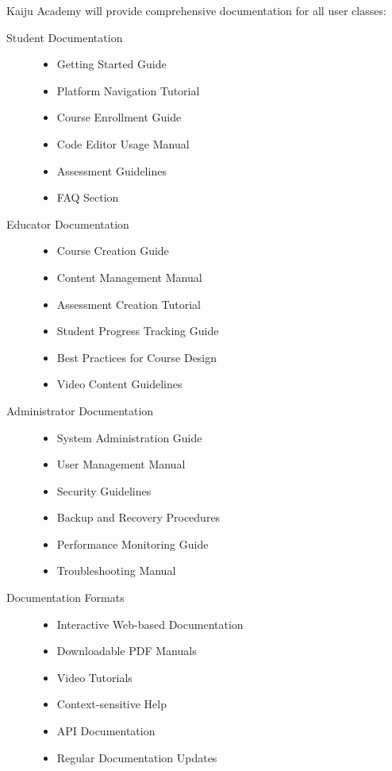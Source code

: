 \documentclass[a4paper, 11pt]{scrreprt}
\begin{document}
Kaiju Academy will provide comprehensive documentation for all user classes:

\begin{description}
    \item[Student Documentation]
        \begin{itemize}
            \item Getting Started Guide
            \item Platform Navigation Tutorial
            \item Course Enrollment Guide
            \item Code Editor Usage Manual
            \item Assessment Guidelines
            \item FAQ Section
        \end{itemize}
    
    \item[Educator Documentation]
        \begin{itemize}
            \item Course Creation Guide
            \item Content Management Manual
            \item Assessment Creation Tutorial
            \item Student Progress Tracking Guide
            \item Best Practices for Course Design
            \item Video Content Guidelines
        \end{itemize}
    
    \item[Administrator Documentation]
        \begin{itemize}
            \item System Administration Guide
            \item User Management Manual
            \item Security Guidelines
            \item Backup and Recovery Procedures
            \item Performance Monitoring Guide
            \item Troubleshooting Manual
        \end{itemize}
    
    \item[Documentation Formats]
        \begin{itemize}
            \item Interactive Web-based Documentation
            \item Downloadable PDF Manuals
            \item Video Tutorials
            \item Context-sensitive Help
            \item API Documentation
            \item Regular Documentation Updates
        \end{itemize}
\end{description}
\end{document}
